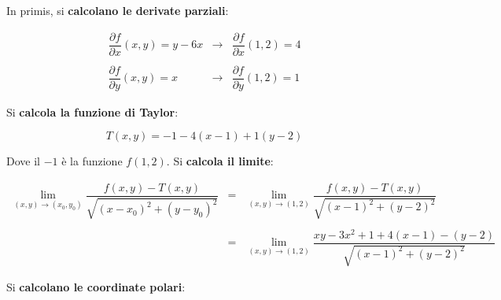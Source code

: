 \documentclass[a4paper]{article}
\begin{document}
	\noindent
	In primis, si \textbf{calcolano le derivate parziali}:
	
	\begin{equation*}
		\begin{array}{lll}
			\dfrac{\partial f}{\partial x}\left(x,y\right) = y - 6x & \longrightarrow & \dfrac{\partial f}{\partial x}\left(1,2\right) = 4 \\
			&& \\
			\dfrac{\partial f}{\partial y}\left(x,y\right) = x		& \longrightarrow & \dfrac{\partial f}{\partial y}\left(1,2\right) = 1
		\end{array}
	\end{equation*}

	\noindent
	Si \textbf{calcola la funzione di Taylor}:
	
	\begin{equation*}
		T\left(x,y\right) = -1 - 4\left(x-1\right) + 1\left(y-2\right)
	\end{equation*}
	
	\noindent
	Dove il $-1$ è la funzione $f\left(1,2\right)$. Si \textbf{calcola il limite}:
	
	\begin{equation*}
		\begin{array}{lll}
			\lim_{\left(x,y\right) \rightarrow \left(x_{0}, y_{0}\right)} \dfrac{f\left(x,y\right) - T\left(x,y\right)}{\sqrt{\left(x-x_{0}\right)^{2} + \left(y-y_{0}\right)^{2}}} & = & \lim_{\left(x,y\right) \rightarrow \left(1,2\right)} \dfrac{f\left(x,y\right) - T\left(x,y\right)}{\sqrt{\left(x-1\right)^{2} + \left(y-2\right)^{2}}} \\
			&& \\
			& = & \lim_{\left(x,y\right) \rightarrow \left(1,2\right)} \dfrac{xy - 3x^{2} + 1 + 4\left(x-1\right) - \left(y-2\right)}{\sqrt{\left(x-1\right)^{2} + \left(y-2\right)^{2}}}
		\end{array}
	\end{equation*}

	\noindent
	Si \textbf{calcolano le coordinate polari}:
	
\end{document}
